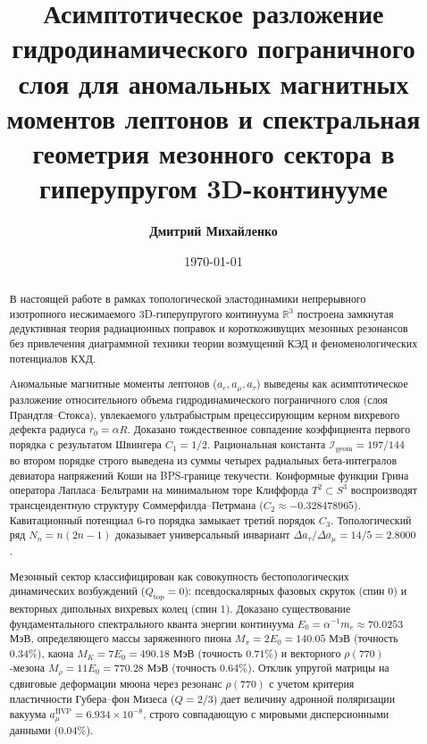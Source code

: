 \documentclass[12pt,a4paper]{article}
\title{\textbf{Асимптотическое разложение гидродинамического пограничного слоя для аномальных магнитных моментов лептонов и спектральная геометрия мезонного сектора в гиперупругом 3D-континууме}}
\author{\textbf{Дмитрий Михайленко}}
\date{\today}
\begin{document}
	
	\maketitle
	
	\begin{abstract}
		В настоящей работе в рамках топологической эластодинамики непрерывного изотропного несжимаемого 3D-гиперупругого континуума $\mathbb{R}^3$ построена замкнутая дедуктивная теория радиационных поправок и короткоживущих мезонных резонансов без привлечения диаграммной техники теории возмущений КЭД и феноменологических потенциалов КХД. 
		
		Аномальные магнитные моменты лептонов ($a_e, a_\mu, a_\tau$) выведены как асимптотическое разложение относительного объема гидродинамического пограничного слоя (слоя Прандтля--Стокса), увлекаемого ультрабыстрым прецессирующим керном вихревого дефекта радиуса $r_0 = \alpha R$. Доказано тождественное совпадение коэффициента первого порядка с результатом Швингера $C_1 = 1/2$. Рациональная константа $\mathcal{I}_{\text{geom}} = 197/144$ во втором порядке строго выведена из суммы четырех радиальных бета-интегралов девиатора напряжений Коши на BPS-границе текучести. Конформные функции Грина оператора Лапласа--Бельтрами на минимальном торе Клиффорда $T^2 \subset S^3$ воспроизводят трансцендентную структуру Соммерфилда--Петрмана ($C_2 \approx -0.328478965$). Кавитационный потенциал 6-го порядка замыкает третий порядок $C_3$. Топологический ряд $N_n = n(2n-1)$ доказывает универсальный инвариант $\Delta a_\tau / \Delta a_\mu = 14/5 = 2.8000$.
		
		Мезонный сектор классифицирован как совокупность бестопологических динамических возбуждений ($Q_{\text{top}} = 0$): псевдоскалярных фазовых скруток (спин 0) и векторных дипольных вихревых колец (спин 1). Доказано существование фундаментального спектрального кванта энергии континуума $E_0 = \alpha^{-1} m_e \approx 70.0253$ МэВ, определяющего массы заряженного пиона $M_\pi = 2 E_0 = 140.05$ МэВ (точность $0.34\%$), каона $M_K = 7 E_0 = 490.18$ МэВ (точность $0.71\%$) и векторного $\rho(770)$-мезона $M_\rho = 11 E_0 = 770.28$ МэВ (точность $0.64\%$). Отклик упругой матрицы на сдвиговые деформации мюона через резонанс $\rho(770)$ с учетом критерия пластичности Губера--фон Мизеса ($Q = 2/3$) дает величину адронной поляризации вакуума $a_\mu^{\text{HVP}} = 6.934 \times 10^{-8}$, строго совпадающую с мировыми дисперсионными данными ($0.04\%$).
	\end{abstract}
	
	\newpage
	
\end{document}
